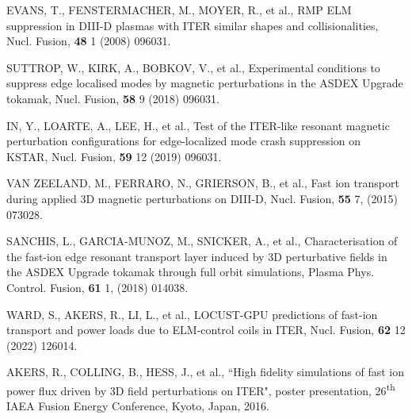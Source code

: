 \documentclass[10pt, a4paper, twoside]{article}
\begin{document}
\begin{thebibliography}{9}
    EVANS, T., FENSTERMACHER, M., MOYER, R., et al.,
    RMP ELM suppression in DIII-D plasmas with ITER similar shapes and collisionalities,
    Nucl. Fusion,
    \textbf{48} 1 
    (2008) 
    096031.

    SUTTROP, W., KIRK, A., BOBKOV, V., et al.,
    Experimental conditions to suppress edge localised modes by magnetic perturbations in the ASDEX Upgrade tokamak,
    Nucl. Fusion,
    \textbf{58} 9 
    (2018) 
    096031.

    IN, Y., LOARTE, A., LEE, H., et al.,
    Test of the ITER-like resonant magnetic perturbation configurations for edge-localized mode crash suppression on KSTAR,
    Nucl. Fusion,
    \textbf{59} 12 
    (2019) 
    096031.
    
    VAN ZEELAND, M., FERRARO, N., GRIERSON, B., et al.,
    Fast ion transport during applied 3D magnetic perturbations on DIII-D,
    Nucl. Fusion,
    \textbf{55} 7,
    (2015)
    073028.

    SANCHIS, L., GARCIA-MUNOZ, M., SNICKER, A., et al.,
    Characterisation of the fast-ion edge resonant transport layer induced by 3D perturbative fields in the ASDEX Upgrade tokamak through full orbit simulations,
    Plasma Phys. Control. Fusion,
    \textbf{61} 1,
    (2018)
    014038.
    
    WARD, S., AKERS, R., LI, L., et al.,
    LOCUST-GPU predictions of fast-ion transport and power loads due to ELM-control coils in ITER,
    Nucl. Fusion,
    \textbf{62} 12
    (2022)
    126014.

    AKERS, R., COLLING, B., HESS, J., et al.,
    ``High fidelity simulations of fast ion power flux driven by 3D field perturbations on ITER",
    poster presentation, 
    26\textsuperscript{th} IAEA Fusion Energy Conference,
    Kyoto, Japan, 
    2016.


\end{thebibliography}
\end{document}
